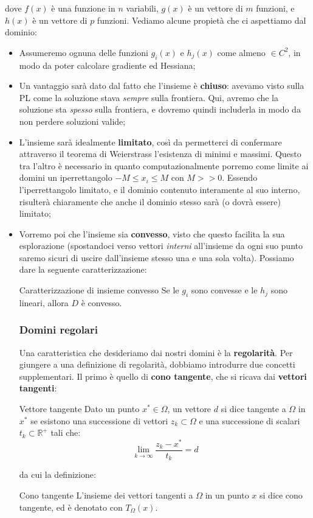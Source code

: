 \documentclass[a4paper,11pt]{article}
\begin{document}
dove $f(x)$ è una funzione in $n$ variabili, $g(x)$ è un vettore di $m$ funzioni, e $h(x)$ è un vettore di $p$ funzioni.
Vediamo alcune propietà che ci aspettiamo dal dominio:
\begin{itemize}
	\item Assumeremo ognuna delle funzioni $g_i(x)$ e $h_j(x)$ come almeno $\in C^2$, in modo da poter calcolare gradiente ed Hessiana;
	\item Un vantaggio sarà dato dal fatto che l'insieme è \textbf{chiuso}: avevamo visto sulla PL come la soluzione stava \textit{sempre} sulla frontiera. Qui, avremo che la soluzione sta \textit{spesso} sulla frontiera, e dovremo quindi includerla in modo da non perdere soluzioni valide;
	\item L'insieme sarà idealmente \textbf{limitato}, così da permetterci di confermare attraverso il teorema di Weierstrass l'esistenza di minimi e massimi.
Questo tra l'altro è necessario in quanto computazionalmente porremo come limite ai domini un iperrettangolo $-M \leq x_i \leq M$ con $M >> 0$.
Essendo l'iperrettangolo limitato, e il dominio contenuto interamente al suo interno, risulterà chiaramente che anche il dominio stesso sarà (o dovrà essere) limitato;
\item Vorremo poi che l'insieme sia \textbf{convesso}, visto che questo facilita la sua esplorazione (spostandoci verso vettori \textit{interni} all'insieme da ogni suo punto saremo sicuri di uscire dall'insieme stesso una e una sola volta).
	Possiamo dare la seguente caratterizzazione:
	\begin{theorem}{Caratterizzazione di insieme convesso}
		Se le $g_i$ sono convesse e le $h_j$ sono lineari, allora $D$ è convesso.
	\end{theorem}

\subsubsection{Domini regolari}
Una caratteristica che desideriamo dai nostri domini è la \textbf{regolarità}.
Per giungere a una definizione di regolarità, dobbiamo introdurre due concetti supplementari.
Il primo è quello di \textbf{cono tangente}, che si ricava dai \textbf{vettori tangenti}:
\begin{definition}{Vettore tangente}
	Dato un punto $x^* \in \Omega$, un vettore $d$ si dice tangente a $\Omega$ in $x^*$ se esistono una successione di vettori $z_k \subset \Omega$ e una successione di scalari $t_k \subset \mathbb{R}^+$ tali che:
	$$
		\lim_{k \rightarrow \infty} \frac{z_k - x^*}{t_k} = d
	$$
\end{definition}
da cui la definizione:
\begin{definition}{Cono tangente}
	L'insieme dei vettori tangenti a $\Omega$ in un punto $x$ si dice cono tangente, ed è denotato con $T_\Omega(x)$.
\end{definition}


\end{itemize}
\end{document}
